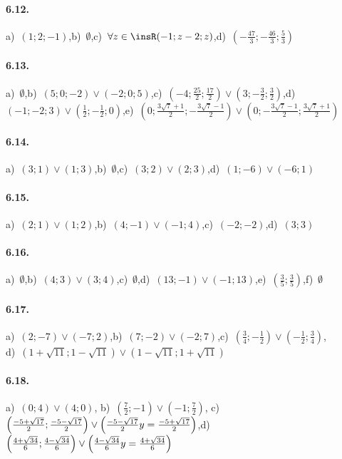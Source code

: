 \paragraph{6.12.} a)~\(\left(1;2;-1\right)\),\quad b)~\(\emptyset \),\quad c)~\(\forall z \in \insR (-1;z-2;z)\),\quad d)~\(\left(-\frac{47} 3;-\frac{46} 3;\frac 5 3\right)\)

\paragraph{6.13.} a)~\(\emptyset \),\quad b)~\(\left(5;0;-2\right)\vee \left(-2;0;5\right)\),\quad c)~\(\left(-4;\frac{25} 2;\frac{17} 2\right)\vee \left(3;-\frac 3 2;\frac 3 2\right)\),\quad d)~\(\left(-1;-2;3\right)\vee \left(\frac 1 2;-\frac 1 2;0\right)\),\quad e)~\(\left(0;\frac{3\sqrt 7+1} 2;-\frac{3\sqrt 7-1} 2\right)\vee \left(0;-\frac{3\sqrt 7-1} 2;\frac{3\sqrt 7+1} 2\right)\)

\paragraph{6.14.} a)~\((3;1)\vee(1;3)\),\quad b)~\(\emptyset \),\quad c)~\((3;2)\vee(2;3)\),\quad d)~\((1;-6)\vee(-6;1)\)

\paragraph{6.15.} a)~\((2;1)\vee(1;2)\),\quad b)~\((4;-1)\vee(-1;4)\),\quad c)~\((-2;-2)\),\quad d)~\((3;3)\)

\paragraph{6.16.} a)~\(\emptyset \),\quad b)~\((4;3)\vee(3;4)\),\quad c)~\(\emptyset \),\quad d)~\((13;-1)\vee(-1;13)\),\quad e)~\(\left(\frac 3 5;\frac 3 5\right)\),\quad f)~\(\emptyset \)

\paragraph{6.17.} a)~\((2;-7)\vee(-7;2)\),\quad b)~\((7;-2)\vee(-2;7)\),\quad c)~\(\left(\frac 3 4;-\frac 1 2\right)\vee\left(-\frac 1 2;\frac 3 4\right)\),\protect\\
\quad d)~\(\left(1+\sqrt{11};1-\sqrt{11}\right)\vee\left(1-\sqrt{11};1+\sqrt{11}\right)\)

\paragraph{6.18.} a)~\((0;4)\vee(4;0)\),\; b)~\(\left(\frac 7 2;-1\right)\vee\left(-1;\frac 7 2\right)\),\; c)~\(\left(\frac{-5+\sqrt{17}} 2;\frac{-5-\sqrt{17}} 2\right)\vee \left(\frac{-5-\sqrt{17}} 2\\y=\frac{-5+\sqrt{17}} 2\right)\),\quad d)~\(\left(\frac{4+\sqrt{34}} 6;\frac{4-\sqrt{34}} 6\right)\vee \left(\frac{4-\sqrt{34}} 6\\y=\frac{4+\sqrt{34}} 6\right)\)

